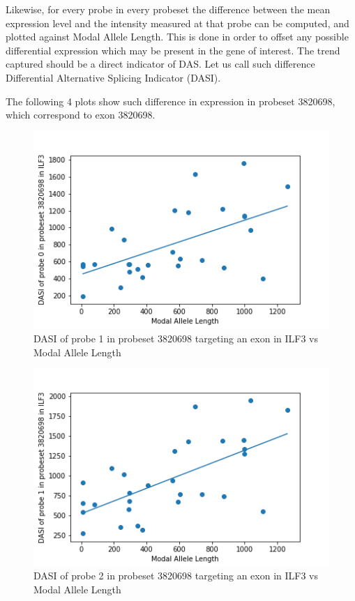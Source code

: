 Likewise, for every probe in every probeset the difference between the mean expression level and the intensity measured at that probe can be computed, and plotted against Modal Allele Length. This is done in order to offset any possible differential expression which may be present in the gene of interest. The trend captured should be a direct indicator of DAS. Let us call such difference Differential Alternative Splicing Indicator (DASI).

The following 4 plots show such difference in expression in probeset 3820698, which correspond to exon 3820698.

\begin{figure}
	\centering
	\includegraphics[width=135mm]{probeILF30.png}
	\caption{DASI of probe 1 in probeset 3820698 targeting an exon in ILF3 vs Modal Allele Length}
    \label{probeILF30}
\end{figure}

\begin{figure}
	\centering
	\includegraphics[width=135mm]{probeILF31.png}
	\caption{DASI of probe 2 in probeset 3820698 targeting an exon in ILF3 vs Modal Allele Length}
    \label{probeILF31}
\end{figure}

